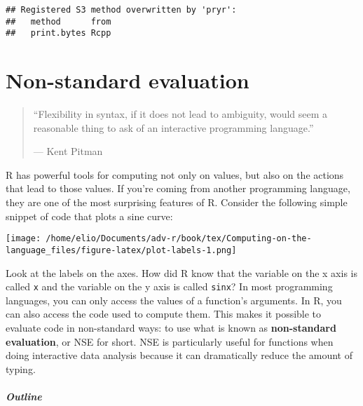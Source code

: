 \begin{verbatim}
## Registered S3 method overwritten by 'pryr':
##   method      from
##   print.bytes Rcpp
\end{verbatim}

\hypertarget{nse}{%
\chapter{Non-standard evaluation}\label{nse}}

\begin{quote}
``Flexibility in syntax, if it does not lead to ambiguity, would seem a
reasonable thing to ask of an interactive programming language.''

--- Kent Pitman
\end{quote}

R has powerful tools for computing not only on values, but also on the
actions that lead to those values. If you're coming from another
programming language, they are one of the most surprising features of R.
Consider the following simple snippet of code that plots a sine curve:

\begin{Shaded}
\begin{Highlighting}[]
\StringTok{ }\NormalTok{(}\NormalTok{, } \OperatorTok{*}\StringTok{ } \NormalTok{)}
\StringTok{ }
 \NormalTok{)}
\end{Highlighting}
\end{Shaded}

\texttt{[image: /home/elio/Documents/adv-r/book/tex/Computing-on-the-language\_files/figure-latex/plot-labels-1.png]}

Look at the labels on the axes. How did R know that the variable on the
x axis is called \texttt{x} and the variable on the y axis is called
\texttt{sinx}? In most programming languages, you can only access the
values of a function's arguments. In R, you can also access the code
used to compute them. This makes it possible to evaluate code in
non-standard ways: to use what is known as \textbf{non-standard
evaluation}, or NSE for short. NSE is particularly useful for functions
when doing interactive data analysis because it can dramatically reduce
the amount of typing. 

\hypertarget{outline}{%
\paragraph{Outline}\label{outline}}

